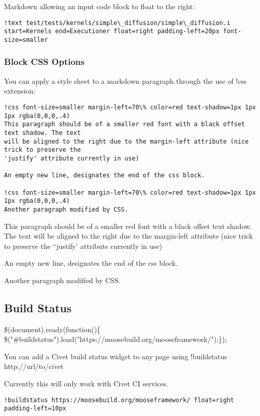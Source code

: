 \documentclass[]{report}
\begin{document}
\par
Markdown allowing an input code block to float to the right:\begin{lstlisting}
!text test/tests/kernels/simple\_diffusion/simple\_diffusion.i start=Kernels end=Executioner float=right padding-left=20px font-size=smaller
\end{lstlisting}\subsubsection{Block CSS Options\label{block-css-options}}
\par
You can apply a style sheet to a markdown paragraph through the use of !css extension:\begin{lstlisting}
!css font-size=smaller margin-left=70\% color=red text-shadow=1px 1px 1px rgba(0,0,0,.4)
This paragraph should be of a smaller red font with a black offset text shadow. The text
will be aligned to the right due to the margin-left attribute (nice trick to preserve the
'justify' attribute currently in use)

An empty new line, designates the end of the css block.

!css font-size=smaller margin-left=70\% color=red text-shadow=1px 1px 1px rgba(0,0,0,.4)
Another paragraph modified by CSS.
\end{lstlisting}
\par
This paragraph should be of a smaller red font with a black offset text shadow. The text
will be aligned to the right due to the margin-left attribute (nice trick to preserve the
``justify' attribute currently in use)
\par
An empty new line, designates the end of the css block.
\par
Another paragraph modified by CSS.\subsection{Build Status\label{build-status}}
\par
\$(document).ready(function()\{ \$("#buildstatus").load("https://moosebuild.org/mooseframework/");\});
\par
You can add a Civet build status widget to any page using !buildstatus http://url/to/civet
\par
Currently this will only work with Civet CI services.\begin{lstlisting}
!buildstatus https://moosebuild.org/mooseframework/ float=right padding-left=10px
\end{lstlisting}
\end{document}
